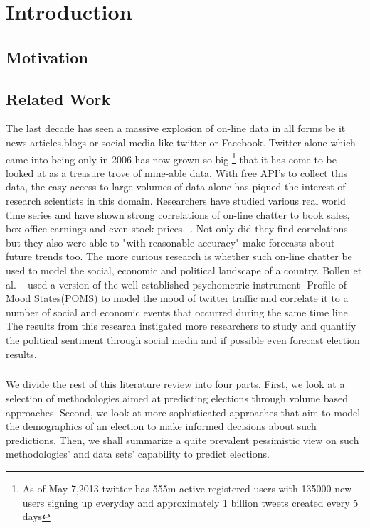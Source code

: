 \chapter{Introduction}

\section{Motivation}


\section{Related Work}
The last decade has seen a massive explosion of on-line data in all forms be it news articles,blogs or social media like twitter or Facebook. Twitter alone which came into being only in 2006 has now grown so big \footnote{As of May 7,2013 twitter has 555m active registered users with 135000 new users signing up everyday and approximately 1 billion tweets created every 5 days} that it has come to be looked at as a treasure trove of mine-able data. With free API's to collect this data, the easy access to large volumes of data alone has piqued the interest of research scientists in this domain. Researchers have studied various real world time series and have shown strong correlations of on-line chatter to book sales, box office earnings and even stock prices.~\cite{gruhl2005predictive,asur2010predicting,bollen2011twitter}. Not only did they find correlations but they also were able to "with reasonable accuracy" make forecasts about future trends too. The more curious research is whether such on-line chatter be used to model the social, economic and political landscape of a country. Bollen et al. ~\cite{bollen2011modeling} used a version of the well-established psychometric instrument- Profile of Mood States(POMS) to model the mood of twitter traffic and correlate it to a number of social and economic events that occurred during the same time line. The results from this research instigated more researchers to study and quantify the political sentiment through social media and if possible even forecast election results.
\paragraph{}
We divide the rest of this literature review into four parts. First, we look at a selection of methodologies aimed at predicting elections through volume based approaches. Second, we look at more sophisticated approaches that aim to model the demographics of an election to make informed decisions about such predictions. Then, we shall summarize a quite prevalent pessimistic view on such methodologies' and data sets' capability to predict elections.
